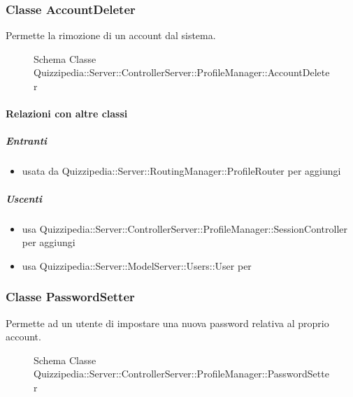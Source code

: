 \subsubsection{Classe AccountDeleter}
Permette la rimozione di un account dal sistema.
\begin{figure}[H]
\centering
\noindent{}
\caption[Schema Classe AccountDeleter]{Schema Classe Quizzipedia::Server::ControllerServer::ProfileManager::AccountDeleter}
\end{figure}
\paragraph{Relazioni con altre classi}
\subparagraph{Entranti}
\begin{itemize}
\item usata da Quizzipedia::Server::RoutingManager::ProfileRouter per aggiungi
\end{itemize}
\subparagraph{Uscenti}
\begin{itemize}
\item usa Quizzipedia::Server::ControllerServer::ProfileManager::SessionController per aggiungi
\item usa Quizzipedia::Server::ModelServer::Users::User per 
\end{itemize}
\subsubsection{Classe PasswordSetter}
Permette ad un utente di impostare una nuova password relativa al proprio account.
\begin{figure}[H]
\centering
\noindent{}
\caption[Schema Classe PasswordSetter]{Schema Classe Quizzipedia::Server::ControllerServer::ProfileManager::PasswordSetter}
\end{figure}

